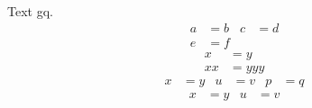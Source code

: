 \documentclass{article}
\begin{document}
Text gq.
\begin{align*}
a &= b & c &= d\\
e &= f
\end{align*}
\begin{align*}
x &= y\\
xx &= yyy
\end{align*}
\begin{align*}
x &= y & u &= v & p &= q
\end{align*}
\begin{align}
x &= y & u &= v
\end{align}
\end{document}
